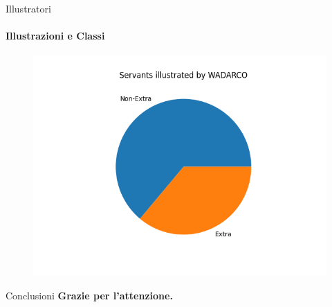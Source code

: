 \documentclass{beamer}
\begin{document}
\begin{darkframes}
  \begin{frame}{Illustratori}
    \framesubtitle{Illustrazioni e Classi}
    \begin{figure}
      \centering
      \includegraphics[scale=0.55]{./images/wadarco.png}
    \end{figure}
  \end{frame}

  \begin{frame}{Conclusioni}
    \textbf{Grazie per l'attenzione.}
  \end{frame}

\end{darkframes}
\end{document}
